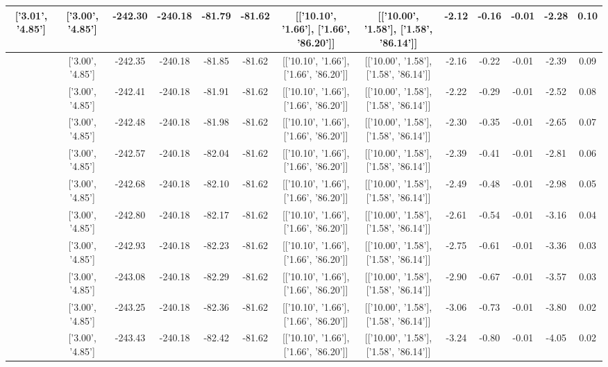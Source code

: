\begin{table}[htbp]
\begin{adjustbox}{angle=90}
\begin{tabular}{|c|c|c|c|c|c|c|c|c|c|c|c|c|}
 ['3.01', '4.85'] & ['3.00', '4.85'] & -242.30 & -240.18 & -81.79 & -81.62 & [['10.10', '1.66'], ['1.66', '86.20']] & [['10.00', '1.58'], ['1.58', '86.14']] & -2.12 & -0.16 & -0.01 & -2.28 & 0.10\\ \hline
 ['3.01', '4.85'] & ['3.00', '4.85'] & -242.35 & -240.18 & -81.85 & -81.62 & [['10.10', '1.66'], ['1.66', '86.20']] & [['10.00', '1.58'], ['1.58', '86.14']] & -2.16 & -0.22 & -0.01 & -2.39 & 0.09\\ \hline
 ['3.02', '4.86'] & ['3.00', '4.85'] & -242.41 & -240.18 & -81.91 & -81.62 & [['10.10', '1.66'], ['1.66', '86.20']] & [['10.00', '1.58'], ['1.58', '86.14']] & -2.22 & -0.29 & -0.01 & -2.52 & 0.08\\ \hline
 ['3.02', '4.86'] & ['3.00', '4.85'] & -242.48 & -240.18 & -81.98 & -81.62 & [['10.10', '1.66'], ['1.66', '86.20']] & [['10.00', '1.58'], ['1.58', '86.14']] & -2.30 & -0.35 & -0.01 & -2.65 & 0.07\\ \hline
 ['3.02', '4.86'] & ['3.00', '4.85'] & -242.57 & -240.18 & -82.04 & -81.62 & [['10.10', '1.66'], ['1.66', '86.20']] & [['10.00', '1.58'], ['1.58', '86.14']] & -2.39 & -0.41 & -0.01 & -2.81 & 0.06\\ \hline
 ['3.03', '4.86'] & ['3.00', '4.85'] & -242.68 & -240.18 & -82.10 & -81.62 & [['10.10', '1.66'], ['1.66', '86.20']] & [['10.00', '1.58'], ['1.58', '86.14']] & -2.49 & -0.48 & -0.01 & -2.98 & 0.05\\ \hline
 ['3.03', '4.86'] & ['3.00', '4.85'] & -242.80 & -240.18 & -82.17 & -81.62 & [['10.10', '1.66'], ['1.66', '86.20']] & [['10.00', '1.58'], ['1.58', '86.14']] & -2.61 & -0.54 & -0.01 & -3.16 & 0.04\\ \hline
 ['3.04', '4.86'] & ['3.00', '4.85'] & -242.93 & -240.18 & -82.23 & -81.62 & [['10.10', '1.66'], ['1.66', '86.20']] & [['10.00', '1.58'], ['1.58', '86.14']] & -2.75 & -0.61 & -0.01 & -3.36 & 0.03\\ \hline
 ['3.04', '4.86'] & ['3.00', '4.85'] & -243.08 & -240.18 & -82.29 & -81.62 & [['10.10', '1.66'], ['1.66', '86.20']] & [['10.00', '1.58'], ['1.58', '86.14']] & -2.90 & -0.67 & -0.01 & -3.57 & 0.03\\ \hline
 ['3.04', '4.86'] & ['3.00', '4.85'] & -243.25 & -240.18 & -82.36 & -81.62 & [['10.10', '1.66'], ['1.66', '86.20']] & [['10.00', '1.58'], ['1.58', '86.14']] & -3.06 & -0.73 & -0.01 & -3.80 & 0.02\\ \hline
 ['3.05', '4.86'] & ['3.00', '4.85'] & -243.43 & -240.18 & -82.42 & -81.62 & [['10.10', '1.66'], ['1.66', '86.20']] & [['10.00', '1.58'], ['1.58', '86.14']] & -3.24 & -0.80 & -0.01 & -4.05 & 0.02\\ \hline

\end{tabular}
\end{adjustbox}
\end{table}
